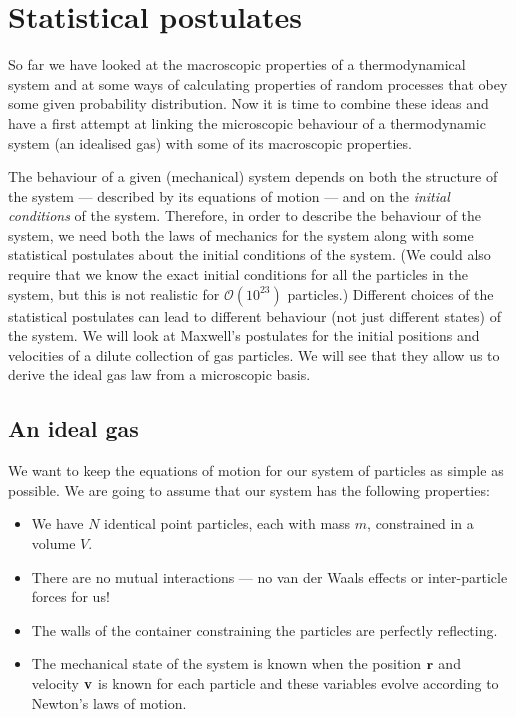 \section{Statistical postulates}
So far we have looked at the macroscopic properties of a thermodynamical system and at some ways of calculating properties of random processes that obey some given probability distribution. Now it is time to combine these ideas and have a first attempt at linking the microscopic behaviour of a thermodynamic system (an idealised gas) with some of its macroscopic properties.

The behaviour of a given (mechanical) system depends on both the structure of the system --- described by its equations of motion --- and on the \emph{initial conditions} of the system. Therefore, in order to describe the behaviour of the system, we need both the laws of mechanics for the system along with some statistical postulates about the initial conditions of the system. (We could also require that we know the exact initial conditions for all the particles in the system, but this is not realistic for $\mathcal{O}(10^{23})$ particles.) Different choices of the statistical postulates can lead to different behaviour (not just different states) of the system. We will look at Maxwell's postulates for the initial positions and velocities of a dilute collection of gas particles. We will see that they allow us to derive the ideal gas law from a microscopic basis.

\subsection{An ideal gas}
We want to keep the equations of motion for our system of particles as simple as possible. We are going to assume   that our system has the following properties:
\begin{itemize}
\item We have $N$ identical  point particles, each with mass $m$, constrained in a volume $V$.
\item There are no mutual interactions --- no van der Waals effects or inter-particle forces for us!
\item The walls of the container constraining the particles are perfectly reflecting.
\item The mechanical state of the system is known when the position $\bf r$ and velocity $\bf v$ is known for each particle and these variables evolve according to Newton's laws of motion.
\end{itemize}

